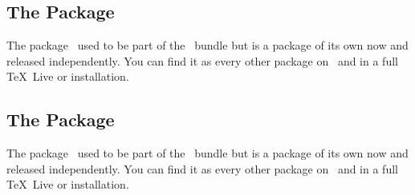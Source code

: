 \documentclass[load-preamble+,scrartcl={DIV10}]{cnltx-doc}
\begin{document}
\subsection{The  Package}
The  package~\cite{pkg:cntformats} used to be part of the
\ExSheets\ bundle but is a package of its own now and
released independently.  You can find it as every other package on \ctan\ and
in a full \TeX~Live or  installation.

\subsection{The  Package}
The  package~\cite{pkg:translations} used to be part of the
\ExSheets\ bundle but is a package of its own now and
released independently.  You can find it as every other package on \ctan\ and
in a full \TeX~Live or  installation.
\end{document}
